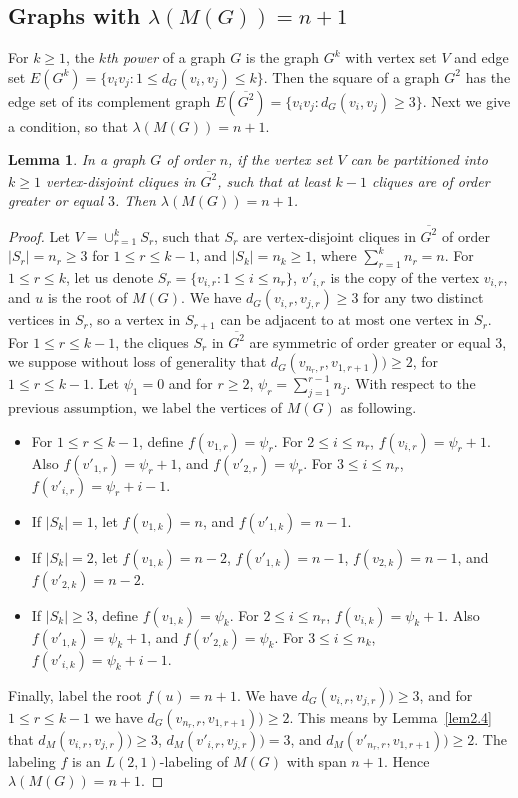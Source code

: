 \documentclass{article}
\newtheorem{lemma} {Lemma}
\newtheorem{open problem} {Open Problem}
\numberwithin{lemma}{section}
\numberwithin{theorem}{section}
\numberwithin{cor}{section}
\numberwithin{prop}{section}
\numberwithin{con}{section}
\numberwithin{claim}{section}
\numberwithin{obs}{section}
\numberwithin{dnt}{section}
\begin{document}
\subsection{Graphs with $\lambda(M(G))=n+1$}\label{sec3.3}
For $k \geq 1$, the \textit{$k$th power} of a graph $G$ is the graph $G^k$ with vertex set $V$ and edge set $E(G^k)=\{v_iv_j: 1\leq d_G(v_i,v_j)\leq k \}$. Then the square of a graph $G^2$ has the edge set of its complement graph $E(\overline{G^2})=\{v_iv_j:  d_G(v_i,v_j)\geq 3 \}$. Next we give a condition, so that $\lambda (M(G))=n+1$. 
\begin{lemma}\label{lemm3.1}
	In a graph $G$ of order $n$, if the vertex set $V$ can be partitioned into $k\geq 1$ vertex-disjoint cliques in $\overline{G^2}$, such that at least $k-1$ cliques are of order greater or equal $3$. Then $\lambda(M(G))=n+1$.	
\end{lemma}
\begin{proof}
	Let $V=\cup_{r=1}^{k}S_r$, such that  $S_r$ are vertex-disjoint cliques in $\overline{G^2}$ of order $|S_r|=n_r\geq 3$ for $1\leq r\leq k-1$, and $|S_k|=n_k\geq 1$, where $\sum_{r=1}^{k}n_r=n$. For $1\leq r\leq k $, let us denote $S_r=\{v_{i,r}: 1\leq i\leq n_r\}$,  $v'_{i,r}$ is the copy of the vertex $v_{i,r}$, and $u$ is the root of $M(G)$. We have  $d_G(v_{i,r},v_{j,r})\geq 3$ for any two distinct vertices in $S_r$, so a vertex in $S_{r+1}$ can be adjacent to at most one vertex in $S_r$. For $1\leq r\leq k-1$, the cliques $S_r$  in $\overline{G^2}$  are symmetric of order greater or equal $3$, we suppose without loss of generality that $d_G(v_{n_r,r},v_{1,r+1}))\geq 2$, for $1\leq r\leq k-1$. Let $\psi_1=0$ and for $r\geq 2$, $\psi_r=\sum_{j=1}^{r-1}n_j$.  With respect to the previous assumption, we label the vertices of $M(G)$ as following.  
	\begin{itemize}
		\item For $1\leq r\leq k-1$, define   $f(v_{1,r})=\psi_r$. For $2\leq i\leq n_r$, $f(v_{i,r})=\psi_r+1$. Also $f(v'_{1,r})=\psi_r+1$, and $f(v'_{2,r})=\psi_r$.  For $3\leq i\leq n_r$, $f(v'_{i,r})=\psi_r+i-1$.
		\item If $|S_k|=1$, let $f(v_{1,k})=n$, and $f(v'_{1,k})=n-1$.
		\item If  $|S_k|=2$, let $f(v_{1,k})=n-2$, $f(v'_{1,k})=n-1$, $f(v_{2,k})=n-1$, and $f(v'_{2,k})=n-2$.
		\item If $|S_k|\geq 3$, define $f(v_{1,k})=\psi_k$. For $2\leq i\leq n_r$, $f(v_{i,k})=\psi_k+1$. Also $f(v'_{1,k})=\psi_k+1$, and $f(v'_{2,k})=\psi_k$. For $3\leq i\leq n_k$, $f(v'_{i,k})=\psi_k+i-1$.
	\end{itemize} 
	\par Finally, label the root $f(u)=n+1$. We have $d_G(v_{i,r},v_{j,r}))\geq 3$, and for $1\leq r\leq k-1$ we have $d_G(v_{n_r,r},v_{1,r+1}))\geq 2$. This means by Lemma~\ref{lem2.4} that $d_M(v_{i,r},v_{j,r}))\geq 3$, $d_M(v'_{i,r},v_{j,r}))= 3$, and  $d_M(v'_{n_r,r},v_{1,r+1}))\geq 2$. The labeling $f$ is an $L(2,1)$-labeling of $M(G)$ with span $n+1$.
	Hence $\lambda(M(G))=n+1$.
\end{proof}
\end{document}
